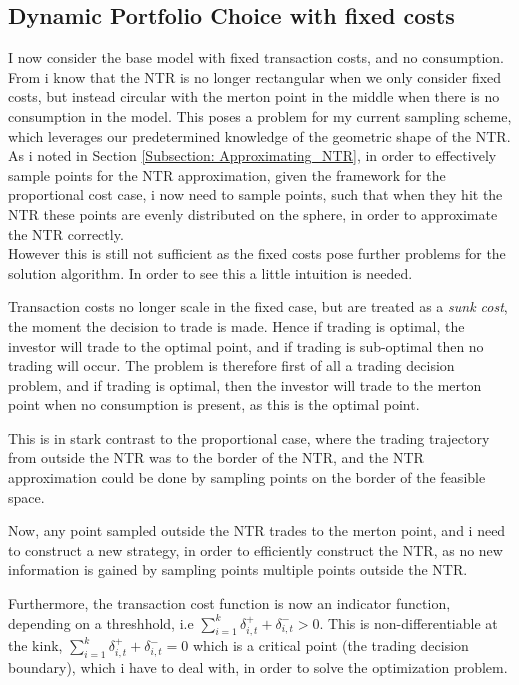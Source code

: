 \documentclass[11pt]{article}
\begin{document}
\subsection{Dynamic Portfolio Choice with fixed costs} \label{Subsection: Results_WithConsumption}
I now consider the base model with fixed transaction costs, and no consumption.
From \autocite{Dybvig2020} i know that the \ac{NTR} is no longer rectangular when we only consider fixed costs, but instead circular with the merton point in the middle when there is no consumption in the model.
This poses a problem for my current sampling scheme, which leverages our predetermined knowledge of the geometric shape of the \ac{NTR}.
As i noted in Section \ref{Subsection: Approximating_NTR}, in order to effectively sample points for the \ac{NTR} approximation, given the framework for the proportional cost case,
 i now need to sample points, such that when they hit the \ac{NTR} these points are evenly distributed on the sphere, in order to approximate the \ac{NTR} correctly.\\
However this is still not sufficient as the fixed costs pose further problems for the solution algorithm. In order to see this a little intuition is needed.

Transaction costs no longer scale in the fixed case, but are treated as a \textit{sunk cost}, the moment the decision to trade is made. Hence if trading is optimal, the investor will trade to the optimal point,
and if trading is sub-optimal then no trading will occur. The problem is therefore first of all a trading decision problem, and if trading is optimal, then the investor will trade to the merton point when no consumption is present, as this is the optimal point.

This is in stark contrast to the proportional case, where the trading trajectory from outside the \ac{NTR} was to the border of the \ac{NTR}, and the \ac{NTR} approximation could be done by sampling points on the border of the feasible space.

Now, any point sampled outside the \ac{NTR} trades to the merton point, and i need to construct a new strategy, 
in order to efficiently construct the \ac{NTR}, as no new information is
gained by sampling points multiple points outside the \ac{NTR}.

Furthermore, the transaction cost function is now an indicator function, depending on a threshhold, i.e $\sum^{k}_{i=1} \delta^{+}_{i,t} + \delta^{-}_{i,t}  > 0$.
This is non-differentiable at the kink, $\sum^{k}_{i=1} \delta^{+}_{i,t} + \delta^{-}_{i,t} =0$ 
which is a critical point (the trading decision boundary), which i have to deal with, in order to solve the optimization problem.
\end{document}
